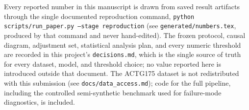 Every reported number in this manuscript is drawn from saved result
artifacts through the single documented reproduction command,
\texttt{python scripts/run\_paper.py --stage reproduction} (see
\texttt{generated/numbers.tex}, produced by that command and never
hand-edited). The frozen protocol, causal diagram, adjustment set,
statistical analysis plan, and every numeric threshold are recorded in
this project's \texttt{decisions.md}, which is the single source of
truth for every dataset, model, and threshold choice; no value reported
here is introduced outside that document. The ACTG175 dataset is not
redistributed with this submission (see \texttt{docs/data\_access.md});
code for the full pipeline, including the controlled semi-synthetic
benchmark used for failure-mode diagnostics, is included.
